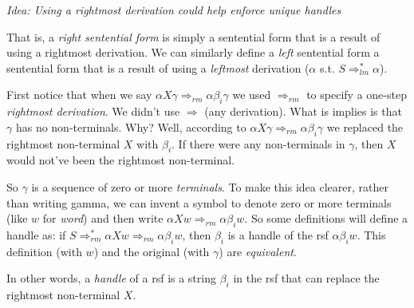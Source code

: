 \frmrule 

\textit{Idea: Using a rightmost derivation could help enforce unique handles}


\frmrule 





That is, a \textit{right sentential form} is simply a sentential form that 
is a result of using a rightmost derivation. 
We can similarly define a \textit{left} sentential form 
a sentential form that 
is a result of using a \textit{leftmost} derivation 
($\alpha$ s.t. $S \Rightarrow^{*}_{lm} \alpha$). 





First notice that when we say $\alpha X \gamma \Rightarrow_{rm} \alpha \beta_i \gamma$ 
we used $\Rightarrow_{rm}$ to specify a one-step \textit{rightmost derivation}. We didn't 
use $\Rightarrow$ (any derivation). What is implies is that 
$\gamma$ has no non-terminals. Why? Well, according to $\alpha X \gamma \Rightarrow_{rm} \alpha \beta_i \gamma$
we replaced the rightmost non-terminal $X$ with $\beta_i$. 
If there were any non-terminals in $\gamma$, then $X$ would not've been the rightmost non-terminal.

So $\gamma$ is a sequence of zero or more \textit{terminals}. 
To make this idea clearer, rather than writing gamma, we can invent a symbol to denote 
zero or more terminals (like $w$ for \textit{word}) and then write $\alpha X w \Rightarrow_{rm} \alpha \beta_i w$.
So some definitions will define a handle as:
if $S \Rightarrow^{*}_{rm} \alpha X w \Rightarrow_{rm} \alpha \beta_i w$, 
then $\beta_i$ is a handle of the rsf $\alpha \beta_i w$. This definition (with $w$) 
and the original (with $\gamma$) are \textit{equivalent}. 

In other words, a \textit{handle} of a rsf is a string $\beta_i$ in the rsf
that can replace the rightmost non-terminal $X$.




